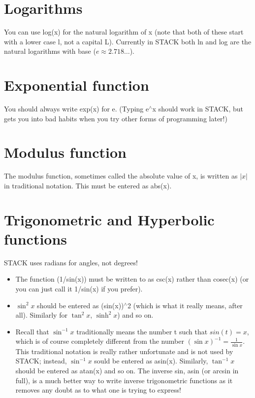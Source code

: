 \documentclass[a4paper]{article}
\begin{document}
\begin{multicols}{2}
\section*{Logarithms}
You can use log(x) for the natural logarithm of x (note that both of these start with a lower case l, not a capital L). Currently in STACK both ln and log are the natural logarithms with base ($e \approx 2.718 \dots$).

\section*{Exponential function}
You should always write exp(x) for e. (Typing e$^{\wedge}$x should work in STACK, but gets you into bad habits when you try other forms of programming later!)

\section*{Modulus function}
The modulus function, sometimes called the absolute value of x, is written as $|x|$ in traditional notation. This must be entered as abs(x).

\section*{Trigonometric and Hyperbolic functions}
STACK uses radians for angles, not degrees!
\begin{itemize}
\item The function (1/sin(x)) must be written to as csc(x) rather than cosec(x) (or you can just call it 1/sin(x) if you prefer).
\item $\sin^2{x}$ should be entered as (sin(x))$^{\wedge}$2 (which is what it really means, after all). Similarly for $\tan^2{x}$, $\sinh^2{x}$) and so on.
\item Recall that $\sin^{-1}{x}$ traditionally means the number t such that $sin(t) = x$, which is of course completely different from the number $(\sin{x})^{-1} = \frac{1}{\sin{x}}$. This traditional notation is really rather unfortunate and is not used by STACK; instead, $\sin^{-1}{x}$ sould be entered as asin(x). Similarly, $\tan^{-1}{x}$ should be entered as atan(x) and so on. The inverse sin, asin (or arcsin in full), is a much better way to write inverse trigonometric functions as it removes any doubt as to what one is trying to express!
\end{itemize}

\newpage


\end{multicols}
\end{document}
